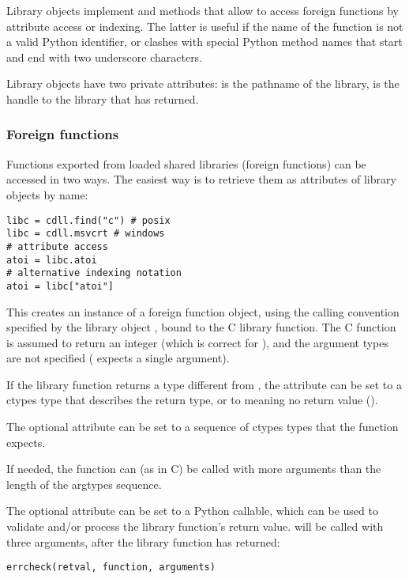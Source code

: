 Library objects implement  and  methods
that allow to access foreign functions by attribute access or
indexing.  The latter is useful if the name of the function is not a
valid Python identifier, or clashes with special Python method names
that start and end with two underscore characters.

Library objects have two private attributes:  is the pathname
of the library,  is the handle to the library that
 has returned.


\subsubsection{Foreign functions\label{ctypes-foreign-functions}}

Functions exported from loaded shared libraries (foreign functions)
can be accessed in two ways. The easiest way is to retrieve them as
attributes of library objects by name:
\begin{verbatim}
libc = cdll.find("c") # posix
libc = cdll.msvcrt # windows
# attribute access
atoi = libc.atoi
# alternative indexing notation
atoi = libc["atoi"]
\end{verbatim}

This creates an instance of a foreign function object, using the
calling convention specified by the library object , bound to
the C library  function.  The C function is assumed to return
an integer (which is correct for ), and the argument types are
not specified ( expects a single  argument).

If the library function returns a type different from , the
 attribute can be set to a ctypes type that describes the
return type, or to  meaning no return value ().

The optional  attribute can be set to a sequence of ctypes
types that the function expects.

If needed, the function can (as in C) be called with more arguments
than the length of the argtypes sequence.

The optional  attribute can be set to a Python callable,
which can be used to validate and/or process the library function's return
value.   will be called with three arguments, after the
library function has returned:
\begin{verbatim}
errcheck(retval, function, arguments)
\end{verbatim}

